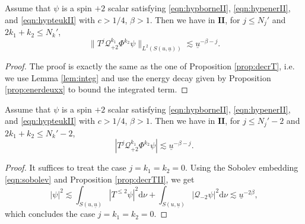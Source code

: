 \documentclass[reqno]{amsart}
\numberwithin{equation}{section}
\newcommand{\mcq}{\mathcal{Q}}
\newcommand{\ubar}{{\underline{u}}}
\newcommand{\dee}{\mathrm{d}}
\newcommand{\deux}{\mathbf{II}}
\theoremstyle{plain}
\theoremstyle{definition}
\theoremstyle{remark}
\numberwithin{equation}{section}
\begin{document}
\begin{prop}\label{prop:decrTII}
    Assume that $\psi$ is a spin $+2$ scalar satisfying \eqref{eqn:hypborneII}, \eqref{eqn:hypenerII}, and \eqref{eqn:hypteukII} with $c>1/4$, $\beta>1$. Then we have in $\deux$, for $j\leq N_j'$ and $2k_1+k_2\leq N_k'$,
    $$\|T^j\mcq_{+2}^{k_1}\Phi^{k_2}\psi\|_{L^2({S(u,\ubar)})}\lesssim\ubar^{-\beta-j}.$$
\end{prop}
\begin{proof}
The proof is exactly the same as the one of Proposition \ref{prop:decrT}, i.e. we use Lemma \ref{lem:integ} and use the energy decay given by Proposition \ref{prop:enerdeuxx} to bound the integrated term.
\end{proof}
\begin{prop}\label{prop:propagII}
    Assume that $\psi$ is a spin $+2$ scalar satisfying \eqref{eqn:hypborneII}, \eqref{eqn:hypenerII}, and \eqref{eqn:hypteukII} with $c>1/4$, $\beta>1$. Then we have in $\deux$, for $j\leq N_j'-2$ and $2k_1+k_2\leq N_k'-2$,
    $$|T^j\mcq_{+2}^{k_1}\Phi^{k_2}\psi|\lesssim\ubar^{-\beta-j}.$$
\end{prop}
\begin{proof}
It suffices to treat the case $j=k_1=k_2=0$. Using the Sobolev embedding \eqref{eqn:sobolev} and Proposition \ref{prop:decrTII},  we get
$$|\psi|^2\lesssim \int_{S(u,\ubar)}|T^{\leq 2}\psi|^2\dee\nu+\int_{S(u,\ubar)}|\mcq_{-2}\psi|^2\dee\nu\lesssim\ubar^{-2\beta},$$
which concludes the case $j=k_1=k_2=0$.
\end{proof}
\end{document}
